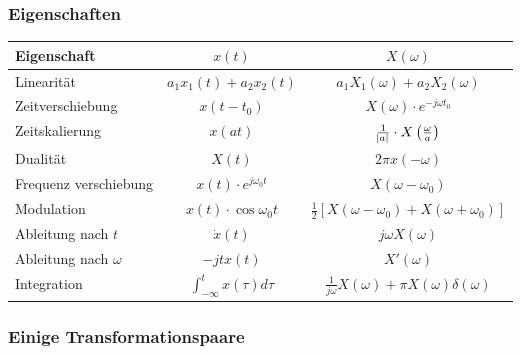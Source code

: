 \documentclass[a4paper]{article}
\begin{document}
\begin{twocolumn}
\subsubsection{Eigenschaften}
\begin{tabular}{lcc}
  Eigenschaft & $x(t)$ & $X(\omega)$ \\
  \toprule
  Linearität & $a_1 x_1(t) + a_2 x_2(t)$ & $a_1 X_1(\omega) + a_2 X_2(\omega)$ \\
  Zeitverschiebung & $x(t-t_0)$ & $X(\omega) \cdot e^{-j \omega t_0}$ \\
  Zeitskalierung & $x(at)$ & $\frac{1}{\abs{a}} \cdot X\left(\frac{\omega}{a}\right)$ \\
  Dualität & $X(t)$ & $2 \pi x(-\omega)$ \\
  Frequenz verschiebung & $x(t) \cdot e^{j \omega_0 t}$ & $X(\omega - \omega_0)$ \\
  Modulation & $x(t) \cdot \cos \omega_0 t$ & $\frac{1}{2} \left[ X(\omega - \omega_0) + X(\omega + \omega_0) \right]$ \\
  Ableitung nach $t$ & $\dot{x}(t)$ & $j \omega X(\omega)$ \\
  Ableitung nach $\omega$ & $-j t x(t)$ & $X'(\omega)$ \\
  Integration & $\int_{-\infty}^t x(\tau) d\tau$ & $\frac{1}{j\omega} X(\omega) + \pi X(\omega) \delta(\omega)$  \\
\end{tabular}

\subsubsection{Einige Transformationspaare}


\end{twocolumn}
\end{document}
